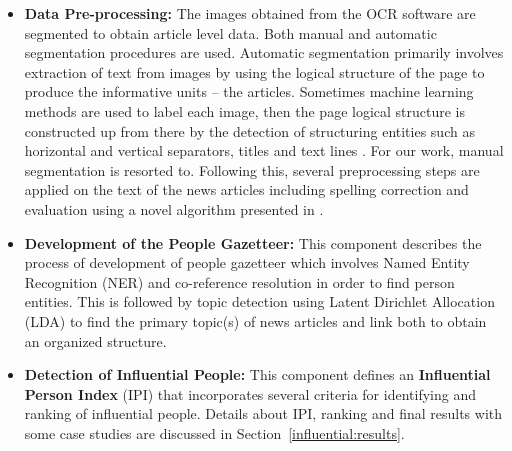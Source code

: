 \begin{itemize}
\item \textbf{Data Pre-processing: } The images obtained from the OCR software are segmented to obtain article level data. Both manual and automatic segmentation procedures are used. Automatic segmentation primarily involves extraction of text from images by using the logical structure of the page to produce the
informative units -- the articles. Sometimes machine learning methods are used to label each image, then the page
logical structure is constructed up from there by the detection of
structuring entities such as horizontal and vertical separators, titles
and text lines \cite{Palfray12}. For our work, manual segmentation is resorted to.
Following this, several preprocessing steps are applied on the text of the news
articles including  spelling correction and evaluation using a novel algorithm presented in \cite{Gupta_14a}.


\item \textbf{Development of the People Gazetteer: }This component describes the process of development
of people gazetteer which involves Named Entity Recognition (NER) and co-reference resolution in order to find person
entities. This is followed by topic detection using Latent Dirichlet Allocation (LDA) to find the primary topic(s) of news articles
and link both to obtain an organized structure.

\item \textbf{Detection of Influential People: } This component defines an \textbf{Influential Person Index}
(IPI) that incorporates several criteria for identifying and ranking of influential
people. Details about IPI, ranking and final results with some case studies are discussed in Section~\ref{influential:results}.
\end{itemize}